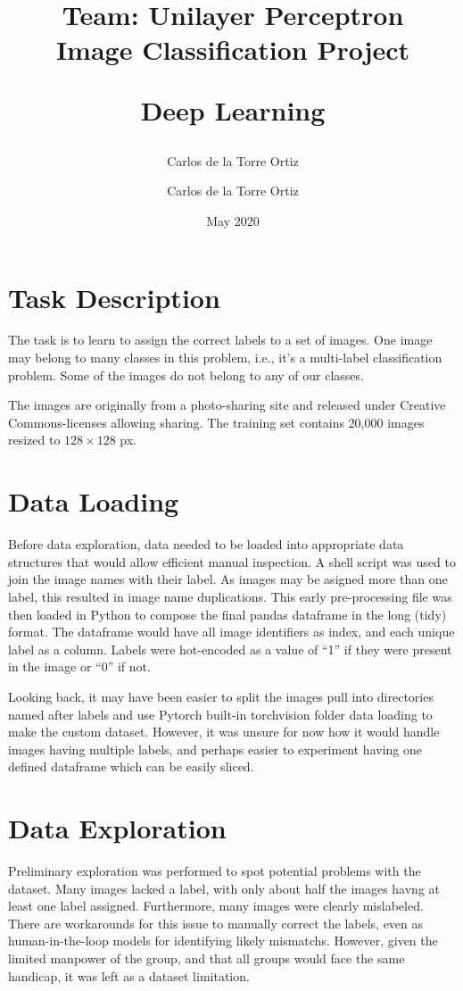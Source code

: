 \documentclass{article}
\author{Carlos de la Torre Ortiz}
\title{{\large Team: Unilayer Perceptron} \\\vspace{0.1\textwidth}
{\Large \textbf{Image Classification Project}} \vspace{0.15\textwidth}
    \begin{center}
        Deep Learning
    \end{center}}
\author{Carlos de la Torre Ortiz}
\date{May 2020}
\begin{document}
\maketitle
\begin{center}
\vspace{0.2\textwidth}
\end{center}
\clearpage

\section{Task Description}

The task is to learn to assign the correct labels to a set of images.
One image may belong to many classes in this problem, i.e., it's a multi-label classification problem.
Some of the images do not belong to any of our classes.

The images are originally from a photo-sharing site and released under Creative Commons-licenses allowing sharing.
The training set contains 20,000 images resized to \(128 \times 128\) px.

\section{Data Loading}
Before data exploration, data needed to be loaded into appropriate data structures that would allow efficient manual inspection.
A shell script was used to join the image names with their label.
As images may be asigned more than one label, this resulted in image name duplications.
This early pre-processing file was then loaded in Python to compose the final pandas dataframe in the long (tidy) format.
The dataframe would have all image identifiers as index, and each unique label as a column.
Labels were hot-encoded as a value of ``1'' if they were present in the image or ``0'' if not.

Looking back, it may have been easier to split the images pull into directories named after labels and use Pytorch built-in torchvision folder data loading to make the custom dataset.
However, it was unsure for now how it would handle images having multiple labels, and perhaps easier to experiment having one defined dataframe which can be easily sliced.

\section{Data Exploration}
Preliminary exploration was performed to spot potential problems with the dataset.
Many images lacked a label, with only about half the images havng at least one label assigned.
Furthermore, many images were clearly mislabeled.
There are workarounds for this issue to manually correct the labels, even as human-in-the-loop models for identifying likely mismatchs.
However, given the limited manpower of the group, and that all groups would face the same handicap, it was left as a dataset limitation.
\end{document}
